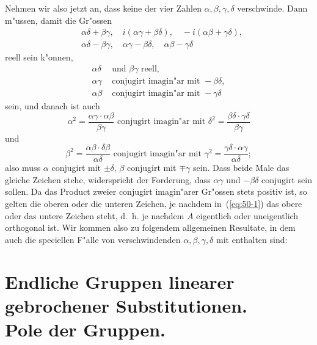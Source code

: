\documentclass[12pt,a4paper]{article}
\theoremstyle{definition}
\begin{document}
Nehmen wir also jetzt an, dass keine der vier Zahlen $\alpha, \beta, \gamma, \delta$ verschwinde. Dann m"ussen, damit die Gr"ossen
\begin{align*}
&\alpha\delta + \beta\gamma, \quad i(\alpha\gamma + \beta\delta), \quad -i(\alpha\beta + \gamma\delta), \\
&\alpha\delta - \beta\gamma, \quad \alpha\gamma - \beta\delta, \quad \alpha\beta - \gamma\delta
\end{align*}
reell sein k"onnen,
\begin{align*}
\alpha\delta &\text{ und } \beta\gamma \text{ reell,} \\
\alpha\gamma &\text{ conjugirt imagin"ar mit } -\beta\delta, \\
\alpha\beta &\text{ conjugirt imagin"ar mit } -\gamma\delta
\end{align*}
sein, und danach ist auch
\[
\alpha^2 = \frac{\alpha\gamma \cdot \alpha\beta}{\beta\gamma} \text{ conjugirt imagin"ar mit } \delta^2 = \frac{\beta\delta \cdot \gamma\delta}{\beta\gamma}
\]
und
\[
\beta^2 = \frac{\alpha\beta \cdot \delta\beta}{\alpha\delta} \text{ conjugirt imagin"ar mit } \gamma^2 = \frac{\gamma\delta \cdot \alpha\gamma}{\alpha\delta};
\]
also muss $\alpha$ conjugirt mit $\pm\delta$, $\beta$ conjugirt mit $\mp\gamma$ sein. Dass beide Male das gleiche Zeichen stehe, widerspricht der Forderung, dass $\alpha\gamma$ und $-\beta\delta$ conjugirt sein sollen. Da das Product zweier conjugirt imagin"arer Gr"ossen stets positiv ist, so gelten die oberen oder die unteren Zeichen, je nachdem in~(\ref{eq:50-1}) das obere oder das untere Zeichen steht, d.~h. je nachdem $A$ eigentlich oder uneigentlich orthogonal ist. Wir kommen also zu folgendem allgemeinen Resultate, in dem auch die speciellen F"alle von verschwindenden $\alpha, \beta, \gamma, \delta$ mit enthalten sind:

\begin{center}
\end{center}


\section{Endliche Gruppen linearer gebrochener Substitutionen.\\Pole der Gruppen.}\label{sec:51}
\end{document}
